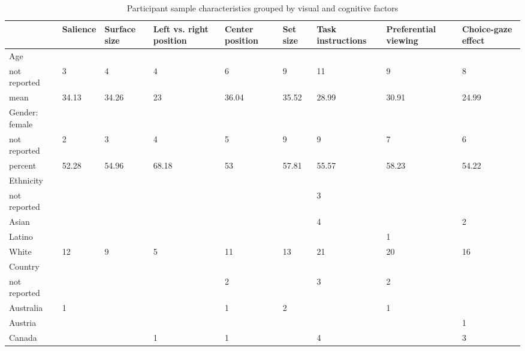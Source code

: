 \begin{table}[ht]
\centering
\caption{Participant sample characteristics grouped by visual and cognitive factors} 
\label{tab:sampleTable}
\begingroup\small
\begin{tabular}{lp{.07\linewidth}p{.07\linewidth}p{.09\linewidth}p{.09\linewidth}p{.07\linewidth}p{.08\linewidth}p{.1\linewidth}p{.07\linewidth}}
  \hline
  & Salience & Surface size & Left vs. right position & Center position & Set size & Task instructions & Preferential viewing & Choice-gaze effect \\ 
  \hline
Age &  &  &  &  &  &  &  &  \\ 
  \hspace{2mm}not reported & 3 & 4 & 4 & 6 & 9 & 11 & 9 & 8 \\ 
  \hspace{2mm}mean & 34.13 & 34.26 & 23 & 36.04 & 35.52 & 28.99 & 30.91 & 24.99 \\ 
  Gender: female &  &  &  &  &  &  &  &  \\ 
  \hspace{2mm}not reported & 2 & 3 & 4 & 5 & 9 & 9 & 7 & 6 \\ 
  \hspace{2mm}percent & 52.28 & 54.96 & 68.18 & 53 & 57.81 & 55.57 & 58.23 & 54.22 \\ 
  Ethnicity &  &  &  &  &  &  &  &  \\ 
  \hspace{2mm}not reported &  &  &  &  &  & 3 &  &  \\ 
  \hspace{2mm}Asian &  &  &  &  &  & 4 &  & 2 \\ 
  \hspace{2mm}Latino &  &  &  &  &  &  & 1 &  \\ 
  \hspace{2mm}White & 12 & 9 & 5 & 11 & 13 & 21 & 20 & 16 \\ 
  Country &  &  &  &  &  &  &  &  \\ 
  \hspace{2mm}not reported &  &  &  & 2 &  & 3 & 2 &  \\ 
  \hspace{2mm}Australia & 1 &  &  & 1 & 2 &  & 1 &  \\ 
  \hspace{2mm}Austria &  &  &  &  &  &  &  & 1 \\ 
  \hspace{2mm}Canada &  &  & 1 & 1 &  & 4 &  & 3 \\ 

\end{tabular}
\end{table}
